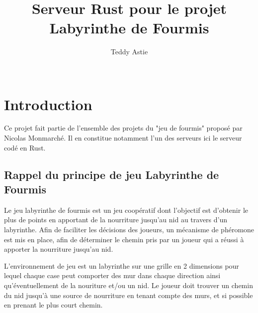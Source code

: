 \documentclass{EPUProjetDi}
\title[Projet FourmiLaby Rust]{Serveur Rust pour le projet Labyrinthe de Fourmis}
\author{Teddy Astie\\ %
\noindent[\url{teddy.astie@etu.univ-tours.fr}]\\
}
\begin{document}
\maketitle

\setcounter{page}{0}

{
\setlength{\parskip}{0em}

\tableofcontents


}


\start

\chapter*{Introduction}

Ce projet fait partie de l'ensemble des projets du "jeu de fourmis" proposé par Nicolas Monmarché. Il en constitue notamment l'un des serveurs ici le serveur codé en Rust.

\section{Rappel du principe de jeu Labyrinthe de Fourmis}

Le jeu labyrinthe de fourmis est un jeu coopératif dont l'objectif est d'obtenir le plus de points en apportant de la nourriture jusqu'au nid au travers d'un labyrinthe. Afin de faciliter les décisions des joueurs, un mécanisme de phéromone est mis en place, afin de déterminer le chemin pris par un joueur qui a réussi à apporter la nourriture jusqu'au nid.

L'environnement de jeu est un labyrinthe sur une grille en 2 dimensions pour lequel chaque case peut comporter des mur dans chaque direction ainsi qu'éventuellement de la nouriture et/ou un nid. Le joueur doit trouver un chemin du nid jusqu'à une source de nourriture en tenant compte des murs, et si possible en prenant le plus court chemin.
\end{document}
